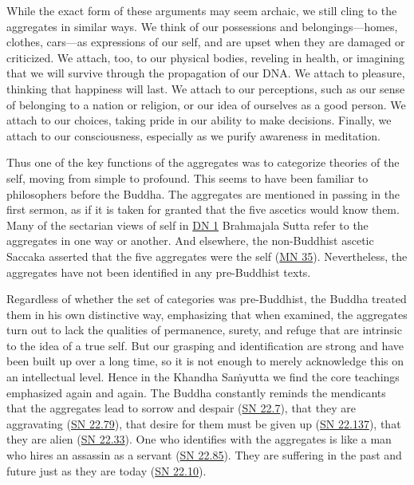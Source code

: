 \documentclass[12pt,openany]{book}%
\begin{document}
While the exact form of these arguments may seem archaic, we still cling to the aggregates in similar ways. We think of our possessions and belongings—homes, clothes, cars—as expressions of our self, and are upset when they are damaged or criticized. We attach, too, to our physical bodies, reveling in health, or imagining that we will survive through the propagation of our DNA. We attach to pleasure, thinking that happiness will last. We attach to our perceptions, such as our sense of belonging to a nation or religion, or our idea of ourselves as a good person. We attach to our choices, taking pride in our ability to make decisions. Finally, we attach to our consciousness, especially as we purify awareness in meditation.

Thus one of the key functions of the aggregates was to categorize theories of the self, moving from simple to profound. This seems to have been familiar to philosophers before the Buddha. The aggregates are mentioned in passing in the first sermon, as if it is taken for granted that the five ascetics would know them. Many of the sectarian views of self in \href{https://suttacentral.net/dn1}{DN 1} Brahmajala Sutta refer to the aggregates in one way or another. And elsewhere, the non-Buddhist ascetic Saccaka asserted that the five aggregates were the self (\href{https://suttacentral.net/mn35}{MN 35}). Nevertheless, the aggregates have not been identified in any pre-Buddhist texts.

Regardless of whether the set of categories was pre-Buddhist, the Buddha treated them in his own distinctive way, emphasizing that when examined, the aggregates turn out to lack the qualities of permanence, surety, and refuge that are intrinsic to the idea of a true self. But our grasping and identification are strong and have been built up over a long time, so it is not enough to merely acknowledge this on an intellectual level. Hence in the Khandha \textsanskrit{Saṁyutta} we find the core teachings emphasized again and again. The Buddha constantly reminds the mendicants that the aggregates lead to sorrow and despair (\href{https://suttacentral.net/sn22.7}{SN 22.7}), that they are aggravating (\href{https://suttacentral.net/sn22.79}{SN 22.79}), that desire for them must be given up (\href{https://suttacentral.net/sn22.137}{SN 22.137}), that they are alien (\href{https://suttacentral.net/sn22.33}{SN 22.33}). One who identifies with the aggregates is like a man who hires an assassin as a servant (\href{https://suttacentral.net/sn22.85}{SN 22.85}). They are suffering in the past and future just as they are today (\href{https://suttacentral.net/sn22.10}{SN 22.10}).
\end{document}
